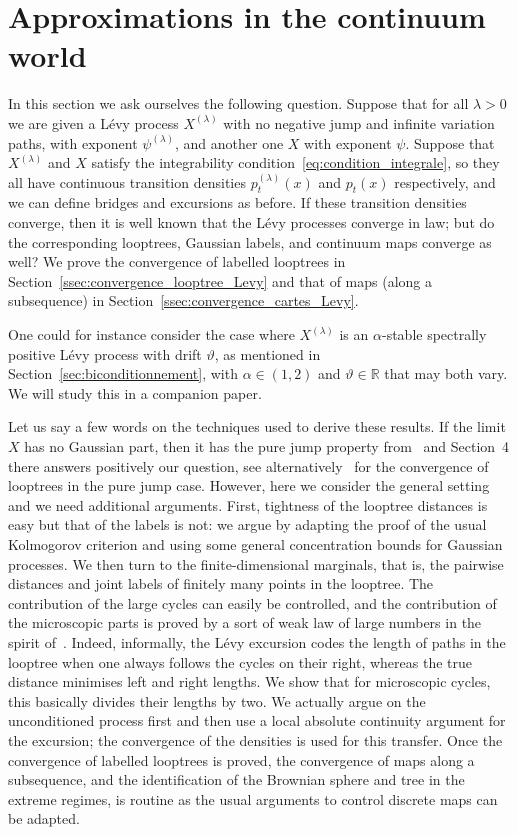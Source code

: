 \documentclass[british, a4paper,11pt]{article}
\numberwithin{equation}{section}
\theoremstyle{definition}
\newcommand{\R}{\mathbb{R}}
\begin{document}
\section{Approximations in the continuum world}
\label{sec:limites_Levy}



In this section we ask ourselves the following question. Suppose that for all $\lambda>0$ we are given a L\'evy process $X^{(\lambda)}$ with no negative jump and infinite variation paths, with exponent $\psi^{(\lambda)}$, and another one $X$ with exponent $\psi$.
Suppose that $X^{(\lambda)}$ and $X$ satisfy the integrability condition~\eqref{eq:condition_integrale}, so they all have continuous transition densities $p^{(\lambda)}_t(x)$ and $p_t(x)$ respectively, and we can define bridges and excursions as before. If these transition densities converge, then it is well known that the L\'evy processes converge in law; but do the corresponding looptrees, Gaussian labels, and continuum maps converge as well? We prove the convergence of labelled looptrees in Section~\ref{ssec:convergence_looptree_Levy} and that of maps (along a subsequence) in Section~\ref{ssec:convergence_cartes_Levy}.


One could for instance consider the case where $X^{(\lambda)}$ is an $\alpha$-stable spectrally positive L\'evy process with drift $\vartheta$, as mentioned in Section~\ref{sec:biconditionnement}, with $\alpha \in (1,2)$ and $\vartheta \in \R$ that may both vary. We will study this in a companion paper.

Let us say a few words on the techniques used to derive these results. If the limit $X$ has no Gaussian part, then it has the pure jump property from~\cite{Mar24} and Section~4 there answers positively our question, see alternatively~\cite[Theorem~3~(iii)]{Kha22} for the convergence of looptrees in the pure jump case. 
However, here we consider the general setting and we need additional arguments.
First, tightness of the looptree distances is easy but that of the labels is not: we argue by adapting the proof of the usual Kolmogorov criterion and using some general concentration bounds for Gaussian processes.
We then turn to the 
finite-dimensional marginals, that is, the pairwise distances and joint labels of finitely many points in the looptree.
The contribution of the large cycles can easily be controlled, and the contribution of the microscopic parts is proved by a sort of weak law of large numbers in the spirit of~\cite{CK14}.
Indeed, informally, the L\'evy excursion codes the length of paths in the looptree when one always follows the cycles on their right, whereas the true distance minimises left and right lengths. 
We show that for microscopic cycles, this basically divides their lengths by two.
We actually argue on the unconditioned process first and then use a local absolute continuity argument for the excursion; the convergence of the densities is used for this transfer.
Once the convergence of labelled looptrees is proved, the convergence of maps along a subsequence, and the identification of the Brownian sphere and tree in the extreme regimes, is routine as the usual arguments to control discrete maps can be adapted.
\end{document}
